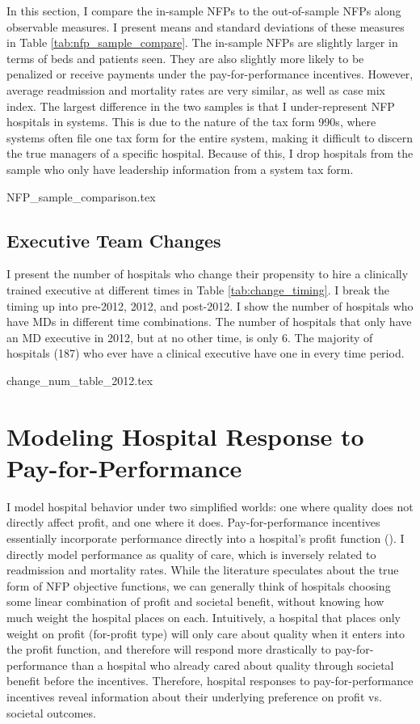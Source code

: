 \documentclass[12pt]{article}
\begin{document}
In this section, I compare the in-sample NFPs to the out-of-sample NFPs along observable measures. I present means and standard deviations of these measures in Table \ref{tab:nfp_sample_compare}. The in-sample NFPs are slightly larger in terms of beds and patients seen. They are also slightly more likely to be penalized or receive payments under the pay-for-performance incentives. However, average readmission and mortality rates are very similar, as well as case mix index. The largest difference in the two samples is that I under-represent NFP hospitals in systems. This is due to the nature of the tax form 990s, where systems often file one tax form for the entire system, making it difficult to discern the true managers of a specific hospital. Because of this, I drop hospitals from the sample who only have leadership information from a system tax form. 

{NFP_sample_comparison.tex}

\subsection{Executive Team Changes}\label{app:changes}

I present the number of hospitals who change their propensity to hire a clinically trained executive at different times in Table \ref{tab:change_timing}. I break the timing up into pre-2012, 2012, and post-2012. I show the number of hospitals who have MDs in different time combinations. The number of hospitals that only have an MD executive in 2012, but at no other time, is only 6. The majority of hospitals (187) who ever have a clinical executive have one in every time period. 

{change_num_table_2012.tex}


\section{Modeling Hospital Response to Pay-for-Performance}\label{sec:model}

    I model hospital behavior under two simplified worlds: one where quality does not directly affect profit, and one where it does. Pay-for-performance incentives essentially incorporate performance directly into a hospital's profit function (\cite{dranove2011health}). I directly model performance as quality of care, which is inversely related to readmission and mortality rates. While the literature speculates about the true form of NFP objective functions, we can generally think of hospitals choosing some linear combination of profit and societal benefit, without knowing how much weight the hospital places on each. Intuitively, a hospital that places only weight on profit (for-profit type) will only care about quality when it enters into the profit function, and therefore will respond more drastically to pay-for-performance than a hospital who already cared about quality through societal benefit before the incentives. Therefore, hospital responses to pay-for-performance incentives reveal information about their underlying preference on profit vs. societal outcomes. 
\end{document}
